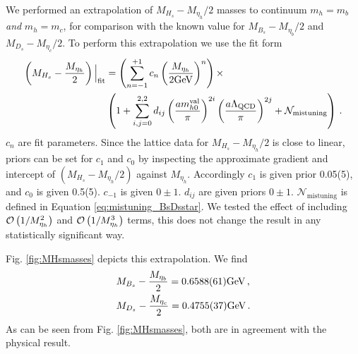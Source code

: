 We performed an extrapolation of $M_{H_s}-M_{\eta_h}/2$ masses to continuum $m_h=m_b$ {\textit{and}} $m_h=m_c$, for comparison with the known value for $M_{B_s}-M_{\eta_b}/2$ and $M_{D_s}-M_{\eta_c}/2$. To perform this extrapolation we use the fit form
\begin{align}
  \left(M_{H_s}-{M_{\eta_h}\over2}\right)\Big|_{\text{fit}}& =
  \left( \sum_{n=-1}^{+1} c_n \left({M_{\eta_h}\over 2\text{GeV}}\right)^n\right) \times
  \\ &\left( 1 + \sum_{i,j=0}^{2,2} d_{ij} \left({ am_{h0}^{\text{val}} \over \pi }\right)^{2i} \left({ a\Lambda_{\text{QCD}} \over \pi }\right)^{2j} + \mathcal{N}_{\text{mistuning}} \right)\,.
    \nonumber
\end{align}
$c_n$ are fit parameters. Since the lattice data for $M_{H_s}-M_{\eta_h}/2$ is close to linear, priors can be set for $c_{1}$ and $c_0$ by inspecting the approximate gradient and intercept of $\left(M_{H_s}-{M_{\eta_h}/2}\right)$ against $M_{\eta_h}$. Accordingly $c_{1}$ is given prior 0.05(5), and $c_0$ is given 0.5(5). $c_{-1}$ is given $0\pm 1$. $d_{ij}$ are given priors $0\pm 1$.  $\mathcal{N}_{\text{mistuning}}$ is defined in Equation \eqref{eq:mistuning_BsDsstar}. We tested the effect of including $\mathcal{O}\left( 1/M_{\eta_h}^2 \right)$ and $\mathcal{O}\left( 1/M_{\eta_h}^3 \right)$ terms, this does not change the result in any statistically significant way.

Fig. \ref{fig:MHsmasses} depicts this extrapolation. We find
\begin{align}
  &M_{B_s} - {M_{\eta_b}\over 2} =  0.6588(61) \text{GeV}\,, \\
  &M_{D_s} - {M_{\eta_c}\over 2} =  0.4755(37)  \text{GeV}\,.
\end{align}
As can be seen from Fig. \ref{fig:MHsmasses}, both are in agreement with the physical result.


